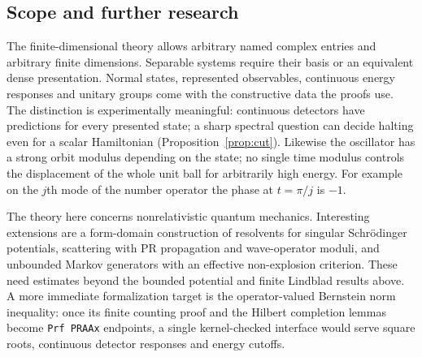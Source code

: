 \subsection{Scope and further research}
The finite-dimensional theory allows arbitrary named complex entries and arbitrary finite dimensions. Separable systems require their basis or an equivalent dense presentation. Normal states, represented observables, continuous energy responses and unitary groups come with the constructive data the proofs use. The distinction is experimentally meaningful: continuous detectors have predictions for every presented state; a sharp spectral question can decide halting even for a scalar Hamiltonian (Proposition~\ref{prop:cut}). Likewise the oscillator has a strong orbit modulus depending on the state; no single time modulus controls the displacement of the whole unit ball for arbitrarily high energy. For example on the $j$th mode of the number operator the phase at $t=\pi/j$ is $-1$.

The theory here concerns nonrelativistic quantum mechanics. Interesting extensions are a form-domain construction of resolvents for singular Schr\"odinger potentials, scattering with PR propagation and wave-operator moduli, and unbounded Markov generators with an effective non-explosion criterion. These need estimates beyond the bounded potential and finite Lindblad results above. A more immediate formalization target is the operator-valued Bernstein norm inequality: once its finite counting proof and the Hilbert completion lemmas become \texttt{Prf PRAAx} endpoints, a single kernel-checked interface would serve square roots, continuous detector responses and energy cutoffs.
